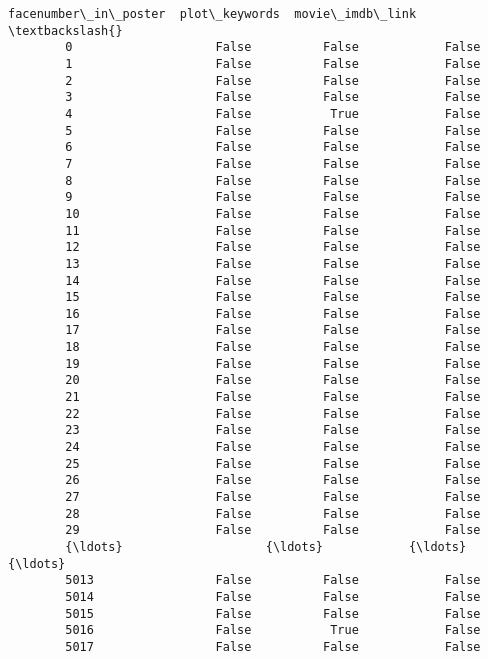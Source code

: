 \documentclass[11pt]{article}
\begin{document}
\begin{Verbatim}[commandchars=\\\{\}]
              facenumber\_in\_poster  plot\_keywords  movie\_imdb\_link  \textbackslash{}
        0                    False          False            False   
        1                    False          False            False   
        2                    False          False            False   
        3                    False          False            False   
        4                    False           True            False   
        5                    False          False            False   
        6                    False          False            False   
        7                    False          False            False   
        8                    False          False            False   
        9                    False          False            False   
        10                   False          False            False   
        11                   False          False            False   
        12                   False          False            False   
        13                   False          False            False   
        14                   False          False            False   
        15                   False          False            False   
        16                   False          False            False   
        17                   False          False            False   
        18                   False          False            False   
        19                   False          False            False   
        20                   False          False            False   
        21                   False          False            False   
        22                   False          False            False   
        23                   False          False            False   
        24                   False          False            False   
        25                   False          False            False   
        26                   False          False            False   
        27                   False          False            False   
        28                   False          False            False   
        29                   False          False            False   
        {\ldots}                    {\ldots}            {\ldots}              {\ldots}   
        5013                 False          False            False   
        5014                 False          False            False   
        5015                 False          False            False   
        5016                 False           True            False   
        5017                 False          False            False   

\end{Verbatim}
\end{document}
